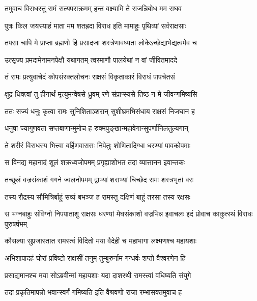 \twolineshloka
{तमुवाच विराधस्तु रामं सत्यपराक्रमम्}
{हन्त वक्ष्यामि ते राजन्निबोध मम राघव} %

\twolineshloka
{पुत्रः किल जयस्याहं माता मम शतह्रदा}
{विराध इति मामाहुः पृथिव्यां सर्वराक्षसाः} %

\twolineshloka
{तपसा चापि मे प्राप्ता ब्रह्मणो हि प्रसादजा}
{शस्त्रेणावध्यता लोकेऽच्छेद्याभेद्यत्वमेव च} %

\twolineshloka
{उत्सृज्य प्रमदामेनामनपेक्षौ यथागतम्}
{त्वरमाणौ पालयेथां न वां जीवितमाददे} %

\twolineshloka
{तं रामः प्रत्युवाचेदं कोपसंरक्तलोचनः}
{राक्षसं विकृताकारं विराधं पापचेतसं} %

\twolineshloka
{क्षुद्र धिक्त्वां तु हीनार्थं मृत्युमन्वेषसे ध्रुवम्}
{रणे संप्राप्स्यसे तिष्ठ न मे जीवन्गमिष्यसि} %

\twolineshloka
{ततः सज्यं धनुः कृत्वा रामः सुनिशिताञ्शरान्}
{सुशीघ्रमभिसंधाय राक्षसं निजघान ह} %

\twolineshloka
{धनुषा ज्यागुणवता सप्तबाणान्मुमोच ह}
{रुक्मपुङ्खान्महावेगान्सुपर्णानिलतुल्यगान्} %

\twolineshloka
{ते शरीरं विराधस्य भित्त्वा बर्हिणवाससः}
{निपेतुः शोणितादिग्धा धरण्यां पावकोपमाः} %

\twolineshloka
{स विनद्य महानादं शूलं शक्रध्वजोपमम्}
{प्रगृह्याशोभत तदा व्यात्तानन इवान्तकः} %

\twolineshloka
{तच्छूलं वज्रसंकाशं गगने ज्वलनोपमम्}
{द्वाभ्यां शराभ्यां चिच्छेद रामः शस्त्रभृतां वरः} %

\twolineshloka
{तस्य रौद्रस्य सौमित्रिर्बाहुं सव्यं बभञ्ज ह}
{रामस्तु दक्षिणं बाहुं तरसा तस्य रक्षसः} %

\threelineshloka
{स भग्नबाहुः संविग्नो निपपाताशु राक्षसः}
{धरण्यां मेघसंकाशो वज्रभिन्न इवाचलः}
{इदं प्रोवाच काकुत्स्थं विराधः पुरुषर्षभम्} %

\twolineshloka
{कौसल्या सुप्रजास्तात रामस्त्वं विदितो मया}
{वैदेही च महाभागा लक्ष्मणश्च महायशाः} %

\twolineshloka
{अभिशापादहं घोरां प्रविष्टो राक्षसीं तनुम्}
{तुम्बुरुर्नाम गन्धर्वः शप्तो वैश्वरणेन हि} %

\twolineshloka
{प्रसाद्यमानश्च मया सोऽब्रवीन्मां महायशाः}
{यदा दाशरथी रामस्त्वां वधिष्यति संयुगे} %

\twolineshloka
{तदा प्रकृतिमापन्नो भवान्स्वर्गं गमिष्यति}
{इति वैश्रवणो राजा रम्भासक्तमुवाच ह} %


